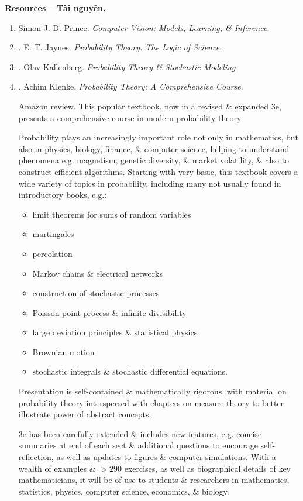 \documentclass{article}
\begin{document}
\noindent\textbf{\textsf{Resources -- Tài nguyên.}}
\begin{enumerate}
	\item {\sc Simon J. D. Prince}. {\it Computer Vision: Models, Learning, \& Inference}.
	
	\item \cite{Jaynes2003}. {\sc E. T. Jaynes}. {\it Probability Theory: The Logic of Science}.
	
	\item \cite{Kallenberg2021}. {\sc Olav Kallenberg}. {\it Probability Theory \& Stochastic Modeling}
	
	\item \cite{Klenke2020}. {\sc Achim Klenke}. {\it Probability Theory: A Comprehensive Course}. {}
	
	{\sf Amazon review.} This popular textbook, now in a revised \& expanded 3e, presents a comprehensive course in modern probability theory.
	
	Probability plays an increasingly important role not only in mathematics, but also in physics, biology, finance, \& computer science, helping to understand phenomena e.g. magnetism, genetic diversity, \& market volatility, \& also to construct efficient algorithms. Starting with very basic, this textbook covers a wide variety of topics in probability, including many not usually found in introductory books, e.g.:
	\begin{itemize}
		\item limit theorems for sums of random variables
		\item martingales
		\item percolation
		\item Markov chains \& electrical networks
		\item construction of stochastic processes
		\item Poisson point process \& infinite divisibility
		\item large deviation principles \& statistical physics
		\item Brownian motion
		\item stochastic integrals \& stochastic differential equations.
	\end{itemize}
	Presentation is self-contained \& mathematically rigorous, with material on probability theory interspersed with chapters on measure theory to better illustrate power of abstract concepts.
	
	3e has been carefully extended \& includes new features, e.g. concise summaries at end of each sect \& additional questions to encourage self-reflection, as well as updates to figures \& computer simulations. With a wealth of examples \& $> 290$ exercises, as well as biographical details of key mathematicians, it will be of use to students \& researchers in mathematics, statistics, physics, computer science, economics, \& biology.
	

\end{enumerate}
\end{document}
